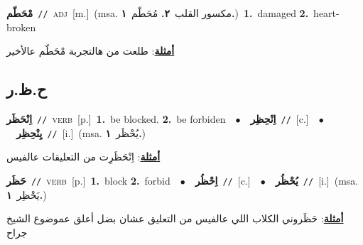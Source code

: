 \documentclass[10pt,a4paper,twoside]{article} %
\begin{document}
\begin{multicols}{2}
{\setlength\topsep{0pt}\textbf{\foreignlanguage{arabic}{مْحَطّم}}\ {\color{gray}\texttt{//}\color{black}}\ \textsc{adj}\ [m.]\ \color{gray}(msa. \foreignlanguage{arabic}{مكسور القلب}~\foreignlanguage{arabic}{\textbf{٢.}}  \foreignlanguage{arabic}{مُحَطّم}~\foreignlanguage{arabic}{\textbf{١.}})\color{black}\ \textbf{1.}~damaged  \textbf{2.}~heart-broken\  \begin{flushright}\color{gray}\foreignlanguage{arabic}{\textbf{\underline{\foreignlanguage{arabic}{أمثلة}}}: طلعت من هالتجربة مْحَطّم عالأخير}\end{flushright}\color{black}} \vspace{2mm}

\vspace{-3mm}
\subsection*{\color{blue}\foreignlanguage{arabic}{ح.ظ.ر}\color{blue}{}} 

{\setlength\topsep{0pt}\textbf{\foreignlanguage{arabic}{اِنْحَظَر}}\ {\color{gray}\texttt{//}\color{black}}\ \textsc{verb}\ [p.]\ \textbf{1.}~be blocked.  \textbf{2.}~be forbiden\ \ $\bullet$\ \ \setlength\topsep{0pt}\textbf{\foreignlanguage{arabic}{اِنْحِظِر}}\ {\color{gray}\texttt{//}\color{black}}\ [c.]\ \ $\bullet$\ \ \setlength\topsep{0pt}\textbf{\foreignlanguage{arabic}{يِنْحِظِر}}\ {\color{gray}\texttt{//}\color{black}}\ [i.]\ \color{gray}(msa. \foreignlanguage{arabic}{يُحْظَر}~\foreignlanguage{arabic}{\textbf{١.}})\color{black}\  \begin{flushright}\color{gray}\foreignlanguage{arabic}{\textbf{\underline{\foreignlanguage{arabic}{أمثلة}}}: اِنْحَظَرِت من التعليقات عالفيس}\end{flushright}\color{black}} \vspace{2mm}

{\setlength\topsep{0pt}\textbf{\foreignlanguage{arabic}{حَظَر}}\ {\color{gray}\texttt{//}\color{black}}\ \textsc{verb}\ [p.]\ \textbf{1.}~block  \textbf{2.}~forbid\ \ $\bullet$\ \ \setlength\topsep{0pt}\textbf{\foreignlanguage{arabic}{اِحْظُر}}\ {\color{gray}\texttt{//}\color{black}}\ [c.]\ \ $\bullet$\ \ \setlength\topsep{0pt}\textbf{\foreignlanguage{arabic}{يُحْظُر}}\ {\color{gray}\texttt{//}\color{black}}\ [i.]\ \color{gray}(msa. \foreignlanguage{arabic}{يَحْظِر}~\foreignlanguage{arabic}{\textbf{١.}})\color{black}\  \begin{flushright}\color{gray}\foreignlanguage{arabic}{\textbf{\underline{\foreignlanguage{arabic}{أمثلة}}}: حَظَروني الكلاب اللي عالفيس من التعليق عشان بضل أعلق عموضوع الشيخ جراح}\end{flushright}\color{black}} \vspace{2mm}


\end{multicols}
\end{document}
